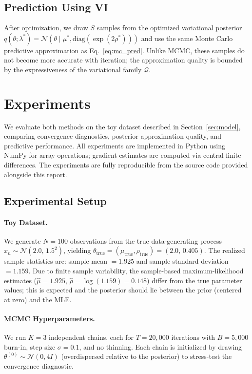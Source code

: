 \documentclass[12pt,a4paper]{article}
\newcommand{\N}{\mathcal{N}}
\newcommand{\lam}{\lambda}
\begin{document}
\subsection{Prediction Using VI}

After optimization, we draw $S$ samples from the optimized variational
posterior $q(\theta; \lam^*) = \N(\theta \mid \mu^*, \mathrm{diag}(\exp(2\rho^*)))$
and use the same Monte Carlo predictive approximation as Eq.~\eqref{eq:mc_pred}.
Unlike MCMC, these samples do not become more accurate with iteration;
the approximation quality is bounded by the expressiveness of the
variational family $\mathcal{Q}$.

\section{Experiments}
\label{sec:experiments}

We evaluate both methods on the toy dataset described in
Section~\ref{sec:model}, comparing convergence diagnostics,
posterior approximation quality, and predictive performance.
All experiments are implemented in Python using NumPy for
array operations; gradient estimates are computed via
central finite differences.
The experiments are fully reproducible from the source code
provided alongside this report.

\subsection{Experimental Setup}

\paragraph{Toy Dataset.}
We generate $N = 100$ observations from the true data-generating
process $x_n \sim \N(2.0,\, 1.5^2)$, yielding
$\theta_{\text{true}} = (\mu_{\text{true}}, \rho_{\text{true}}) = (2.0,\, 0.405)$.
The realized sample statistics are: sample mean $= 1.925$ and
sample standard deviation $= 1.159$.
Due to finite sample variability, the sample-based maximum-likelihood
estimates ($\hat{\mu} = 1.925$, $\hat{\rho} = \log(1.159) = 0.148$)
differ from the true parameter values; this is expected and the posterior
should lie between the prior (centered at zero) and the MLE.

\paragraph{MCMC Hyperparameters.}
We run $K = 3$ independent chains, each for $T = 20{,}000$ iterations
with $B = 5{,}000$ burn-in, step size $\sigma = 0.1$, and no thinning.
Each chain is initialized by drawing
$\theta^{(0)} \sim \N(0, 4I)$ (overdispersed relative to the posterior)
to stress-test the convergence diagnostic.
\end{document}
